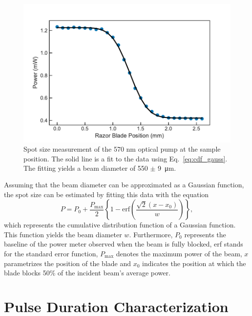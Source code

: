 \begin{figure}[ht]
	\centering
	\includegraphics[scale=0.65]{images/chapter_methods/pump_spot_size}
	\caption{Spot size measurement of the 570 nm optical pump at the sample position. The solid line is a fit to the data using Eq.\ \ref{eq:cdf_gauss}. The fitting yields a beam diameter of 550 $\pm$ \SI{9}{\micro\meter}.}
\end{figure}

Assuming that the beam diameter can be approximated as a Gaussian function, the spot size can be estimated by fitting this data with the equation
%
\begin{equation}
	\label{eq:cdf_gauss}
	P = P_0 + \dfrac{P_{\mathrm{max}}}{2} \left\{ 1 - \mathrm{erf} \left( \dfrac{\sqrt{2}(x - x_0)}{w} \right) \right\},
\end{equation}
%
which represents the cumulative distribution function of a Gaussian function. This function yields the beam diameter $w$. Furthermore, $P_0$ represents the baseline of the power meter observed when the beam is fully blocked, erf stands for the standard error function, $P_\text{max}$ denotes the maximum power of the beam, $x$ parametrizes the position of the blade and $x_0$ indicates the position at which the blade blocks 50\% of the incident beam's average power.

\section{Pulse Duration Characterization}
\label{section:pulse_duration}

